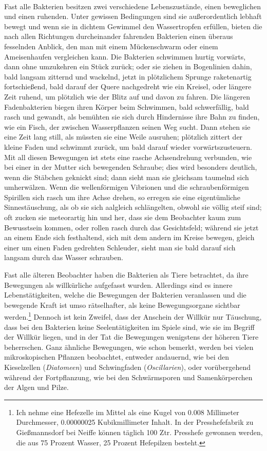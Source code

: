 \documentclass[a4paper, 11pt, oneside, english]{article}
\begin{document}
\paragraph{}
Fast alle Bakterien besitzen zwei verschiedene Lebenszustände, einen beweglichen und einen ruhenden. Unter gewissen Bedingungen sind sie außerordentlich lebhaft bewegt und wenn sie in dichtem Gewimmel den Wassertropfen erfüllen, bieten die nach allen Richtungen durcheinander fahrenden Bakterien einen überaus fesselnden Anblick, den man mit einem Mückenschwarm oder einem Ameisenhaufen vergleichen kann. Die Bakterien schwimmen hurtig vorwärts, dann ohne umzukehren ein Stück zurück; oder sie ziehen in Bogenlinien dahin, bald langsam zitternd und wackelnd, jetzt in plötzlichem Sprunge raketenartig fortschießend, bald darauf der Quere nachgedreht wie ein Kreisel, oder längere Zeit ruhend, um plötzlich wie der Blitz auf und davon zu fahren. Die längeren Fadenbakterien biegen ihren Körper beim Schwimmen, bald schwerfällig, bald rasch und gewandt, als bemühten sie sich durch Hindernisse ihre Bahn zu finden, wie ein Fisch, der zwischen Wasserpflanzen seinen Weg sucht. Dann stehen sie eine Zeit lang still, als müssten sie eine Weile ausruhen; plötzlich zittert der kleine Faden und schwimmt zurück, um bald darauf wieder vorwärtszusteuern. Mit all diesen Bewegungen ist stets eine rasche Achsendrehung verbunden, wie bei einer in der Mutter sich bewegenden Schraube; dies wird besonders deutlich, wenn die Stäbchen geknickt sind; dann sieht man sie gleichsam taumelnd sich umherwälzen. Wenn die wellenförmigen Vibrionen und die schraubenförmigen Spirillen sich rasch um ihre Achse drehen, so erregen sie eine eigentümliche Sinnestäuschung, als ob sie sich aalgleich schlängelten, obwohl sie völlig steif sind; oft zucken sie meteorartig hin und her, dass sie dem Beobachter kaum zum Bewusstsein kommen, oder rollen rasch durch das Gesichtsfeld; während sie jetzt an einem Ende sich festhaltend, sich mit dem andern im Kreise bewegen, gleich einer um einen Faden gedrehten Schleuder, sieht man sie bald darauf sich langsam durch das Wasser schrauben.

Fast alle älteren Beobachter haben die Bakterien als Tiere betrachtet, da ihre Bewegungen als willkürliche aufgefasst wurden. Allerdings sind es innere Lebenstätigkeiten, welche die Bewegungen der Bakterien veranlassen und die bewegende Kraft ist umso rätselhafter, als keine Bewegungsorgane sichtbar werden.\footnote{Ich nehme eine Hefezelle im Mittel als eine Kugel von 0.008 Millimeter Durchmesser, 0.00000025 Kubikmillimeter Inhalt. In der Presshefefabrik zu Gießmannsdorf bei Neiffe können täglich 100 Ztr. Presshefe gewonnen werden, die aus 75 Prozent Wasser, 25 Prozent Hefepilzen besteht.} Dennoch ist kein Zweifel, dass der Anschein der Willkür nur Täuschung, dass bei den Bakterien keine Seelentätigkeiten im Spiele sind, wie sie im Begriff der Willkür liegen, und in der Tat die Bewegungen wenigstens der höheren Tiere beherrschen. Ganz ähnliche Bewegungen, wie schon bemerkt, werden bei vielen mikroskopischen Pflanzen beobachtet, entweder andauernd, wie bei den Kieselzellen (\emph{Diatomeen}) und Schwingfaden (\emph{Oscillarien}), oder vorübergehend während der Fortpflanzung, wie bei den Schwärmsporen und Samenkörperchen der Algen und Pilze.
\end{document}
